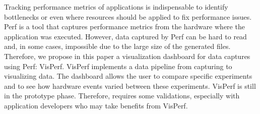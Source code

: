 Tracking performance metrics of applications is indispensable to identify bottlenecks or even where resources should be applied to fix performance issues. Perf is a tool that captures performance metrics from the hardware where the application was executed. However, data captured by Perf can be hard to read and, in some cases, impossible due to the large size of the generated files. Therefore, we propose in this paper a visualization dashboard for data captures using Perf: VisPerf. VisPerf implements a data pipeline from capturing to visualizing data. The dashboard allows the user to compare specific experiments and to see how hardware events varied between these experiments. VisPerf is still in the prototype phase. Therefore, requires some validations, especially with application developers who may take benefits from VisPerf.
